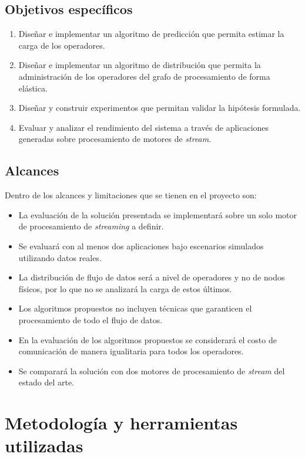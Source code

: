 \subsection{Objetivos específicos}
\begin{enumerate}
	\item Dise\~nar e implementar un algoritmo de predicci\'on que permita estimar la carga de los operadores.
	\item Dise\~nar e implementar un algoritmo de distribuci\'on que permita la administraci\'on de los operadores del grafo de procesamiento de forma el\'astica.
	\item Dise\~nar y construir experimentos que permitan validar la hip\'otesis formulada.
	\item Evaluar y analizar el rendimiento del sistema a trav\'es de aplicaciones generadas sobre procesamiento de motores de \textsl{stream}.
\end{enumerate}

\subsection{Alcances}
Dentro de los alcances y limitaciones que se tienen en el proyecto son:
\begin{itemize}
	\item La evaluación de la solución presentada se implementará sobre un solo motor de procesamiento de \textsl{streaming} a definir.
	\item Se evaluará con al menos dos aplicaciones bajo escenarios simulados utilizando datos reales.
	\item La distribución de flujo de datos será a nivel de operadores y no de nodos f\'isicos, por lo que no se analizará la carga de estos \'ultimos.
	\item Los algoritmos propuestos no incluyen t\'ecnicas que garanticen el procesamiento de todo el flujo de datos.
	\item En la evaluación de los algoritmos propuestos se considerará el costo de comunicación de manera igualitaria para todos los operadores.
	\item Se comparará la solución con dos motores de procesamiento de \textsl{stream} del estado del arte.
\end{itemize}


\section{Metodología y herramientas utilizadas}
\label{intro:metodologia}

